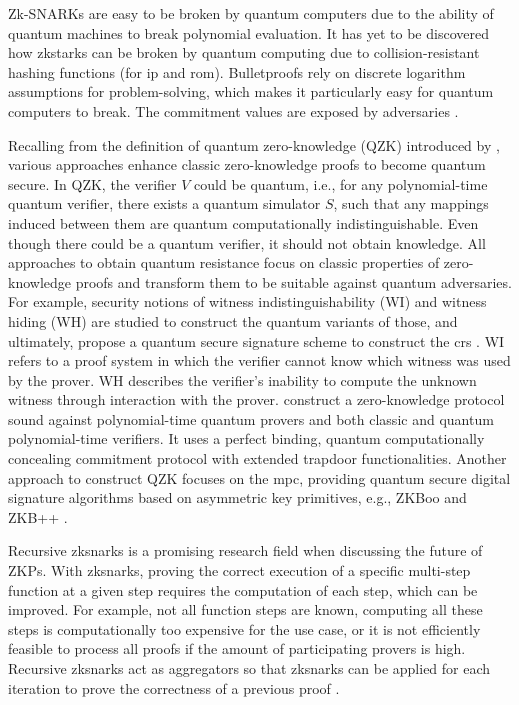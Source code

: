 Zk-SNARKs are easy to be broken by quantum computers due to the ability of quantum machines to break polynomial evaluation. It has yet to be discovered how \acrshort{zkstark}s can be broken by quantum computing due to collision-resistant hashing functions (for \acrshort{ip} and \acrshort{rom}). Bulletproofs rely on discrete logarithm assumptions for problem-solving, which makes it particularly easy for quantum computers to break. The commitment values are exposed by adversaries \citep{gongetal}. 

Recalling from the definition of quantum zero-knowledge (QZK) introduced by \citet{watrousqzk}, various approaches enhance classic zero-knowledge proofs to become quantum secure. In QZK, the verifier \(V\) could be quantum, i.e., for any polynomial-time quantum verifier, there exists a quantum simulator \(S\), such that any mappings induced between them are quantum computationally indistinguishable. Even though there could be a quantum verifier, it should not obtain knowledge. All approaches to obtain quantum resistance focus on classic properties of zero-knowledge proofs and transform them to be suitable against quantum adversaries. For example, security notions of witness indistinguishability (WI) and witness hiding (WH) are studied to construct the quantum variants of those, and ultimately, propose a quantum secure signature scheme to construct the \acrshort{crs} \citep{xieyang2019, katzetal}. WI refers to a proof system in which the verifier cannot know which witness was used by the prover. WH describes the verifier's inability to compute the unknown witness through interaction with the prover. \citet{Vidick2020classicalzero} construct a zero-knowledge protocol sound against polynomial-time quantum provers and both classic and quantum polynomial-time verifiers. It uses a perfect binding, quantum computationally concealing commitment protocol with extended trapdoor functionalities. Another approach to construct QZK focuses on the \acrshort{mpc}, providing quantum secure digital signature algorithms based on asymmetric key primitives, e.g., ZKBoo and ZKB++ \citep{gongetal}.

Recursive \acrshort{zksnark}s is a promising research field when discussing the future of ZKPs. With \acrshort{zksnark}s, proving the correct execution of a specific multi-step function at a given step requires the computation of each step, which can be improved. For example, not all function steps are known, computing all these steps is computationally too expensive for the use case, or it is not efficiently feasible to process all proofs if the amount of participating provers is high. Recursive \acrshort{zksnark}s act as aggregators so that \acrshort{zksnark}s can be applied for each iteration to prove the correctness of a previous proof \citep{chen2022review}.